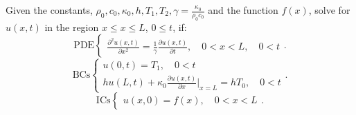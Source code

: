 \documentclass[../main/main.tex]{subfiles}
\begin{document}
Given the constants, $\rho_0, c_0, \kappa_0, h, T_1, T_2, \gamma= \frac{\kappa_0}{\rho_0c_0}$ and the function $f(x)$, solve for  $u(x,t)$ in the region $x\le x \le  L$,  $0\le t$, if: \[
	\text{PDE}\begin{cases}
		\frac{\partial ^2 u(x,t)}{\partial x^2}  = \frac{1}{\gamma} \frac{\partial u(x,t)}{\partial t} ,\quad 0 < x < L , \quad 0 < t 
	\end{cases}.\] \[
	\text{BCs}\begin{cases}
		u(0,t) = T_1, \quad 0 < t\\
hu(L,t) + \kappa_0 \frac{\partial u(x,t)}{\partial x} \bigg\rvert_{x=L} = hT_0, \quad 0 < t
	\end{cases}
.\]
\[
	\text{ICs}\begin{cases}
		
u(x,0) = f(x) , \quad 0 < x < L
	\end{cases}
.\] 
\end{document}
